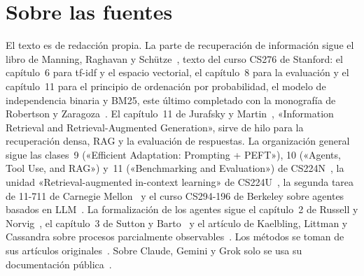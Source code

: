 \documentclass[11pt,a4paper,twoside,openany]{book}
\begin{document}
\section*{Sobre las fuentes}
El texto es de redacción propia. La parte de recuperación de información sigue el libro de Manning, Raghavan y Schütze~\cite{iir}, texto del curso CS276 de Stanford: el capítulo~6 para tf-idf y el espacio vectorial, el capítulo~8 para la evaluación y el capítulo~11 para el principio de ordenación por probabilidad, el modelo de independencia binaria y BM25, este último completado con la monografía de Robertson y Zaragoza~\cite{rz}. El capítulo~11 de Jurafsky y Martin~\cite{jm3}, «Information Retrieval and Retrieval-Augmented Generation», sirve de hilo para la recuperación densa, RAG y la evaluación de respuestas. La organización general sigue las clases~9 («Efficient Adaptation: Prompting + PEFT»), 10 («Agents, Tool Use, and RAG») y~11 («Benchmarking and Evaluation») de CS224N~\cite{cs224n}, la unidad «Retrieval-augmented in-context learning» de CS224U~\cite{cs224u}, la segunda tarea de 11-711 de Carnegie Mellon~\cite{cmu711} y el curso CS294-196 de Berkeley sobre agentes basados en LLM~\cite{cs294}. La formalización de los agentes sigue el capítulo~2 de Russell y Norvig~\cite{aima}, el capítulo~3 de Sutton y Barto~\cite{sb} y el artículo de Kaelbling, Littman y Cassandra sobre procesos parcialmente observables~\cite{kaelbling}. Los métodos se toman de sus artículos originales~\cite{brown,olsson,vonoswald,wei-cot,kojima,wang-sc,yao-tot,dpr,rag,jegou,hnsw,faiss,cormack,react,toolformer,greshake}. Sobre Claude, Gemini y Grok solo se usa su documentación pública~\cite{claude-tools,gemini-fc,xai-fc,mcp,mcp-spec}.
\end{document}
